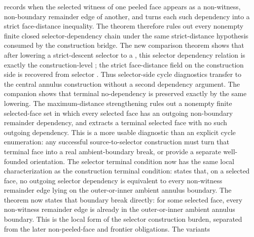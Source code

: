 \documentclass[11pt]{article}
\begin{document}
records when the selected witness of one peeled face appears as a non-witness,
non-boundary remainder edge of another, and
turns each such dependency into a strict face-distance inequality.  The theorem
therefore rules out every nonempty finite closed selector-dependency chain
under the same strict-distance hypothesis consumed by the construction bridge.
The new comparison theorem
shows that after lowering a strict-descent selector to a
, this selector dependency relation is
exactly the construction-level
; the strict
face-distance field on the construction side is recovered from selector
.  Thus selector-side cycle diagnostics transfer to the central
annulus construction without a second dependency argument.  The companion
shows that terminal no-dependency is preserved exactly by the same lowering.
The maximum-distance strengthening
rules out a nonempty finite selected-face set in which every selected face has
an outgoing non-boundary remainder dependency, and
extracts a terminal selected face with no such outgoing dependency.  This is a
more usable diagnostic than an explicit cycle enumeration: any successful
source-to-selector construction must turn that terminal face into a real
ambient-boundary break, or provide a separate well-founded orientation.
The selector terminal condition now has the same local characterization as the
construction terminal condition:
states that, on a selected face, no outgoing selector dependency is equivalent
to every non-witness remainder edge lying on the outer-or-inner ambient annulus
boundary.
The theorem
now states that boundary break directly: for some selected face, every
non-witness remainder edge is already in the outer-or-inner ambient annulus
boundary.  This is the local form of the selector construction burden, separated
from the later non-peeled-face and frontier obligations.  The variants
\end{document}
